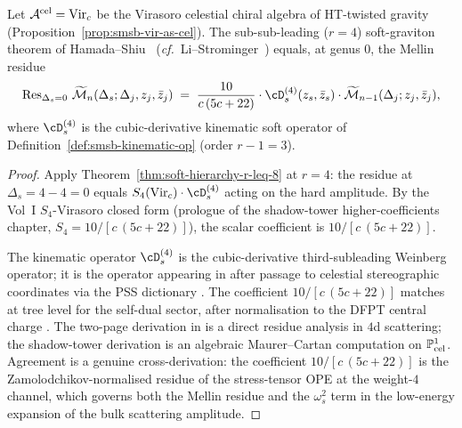 \begin{theorem}[$r = 4$ shadow coefficient = HSL sub-sub-leading soft graviton]
\label{thm:r-eq-4-is-leading-subsubleading}
\ClaimStatusProvedHere
Let $\mathcal A^{\mathrm{cel}} = \mathrm{Vir}_c$ be the Virasoro celestial chiral
algebra of HT-twisted gravity
(Proposition~\ref{prop:smsb-vir-as-cel}). The sub-sub-leading
($r = 4$) soft-graviton theorem of Hamada--Shiu~\cite{HamadaShiuSubsubSoft}
(\emph{cf.}\ Li--Strominger~\cite[\S 4]{LiStromingerHigherSoft}) equals,
at genus $0$, the Mellin residue
\[
 \Res_{\Delta_s = 0}\,\Mel\cM_n(\Delta_s; \Delta_j, z_j, \bar z_j)
 \;=\;
 \frac{10}{c\,(5 c + 22)}\cdot
 \cD_s^{(4)}(z_s, \bar z_s)\cdot
 \Mel\cM_{n - 1}(\Delta_j; z_j, \bar z_j),
\]
where $\cD_s^{(4)}$ is the cubic-derivative kinematic soft operator of
Definition~\ref{def:smsb-kinematic-op} (order $r - 1 = 3$).
\end{theorem}

\begin{proof}
Apply Theorem~\ref{thm:soft-hierarchy-r-leq-8} at $r = 4$: the residue
at $\Delta_s = 4 - 4 = 0$ equals $S_4(\Vir_c)\cdot \cD_s^{(4)}$ acting
on the hard amplitude. By the Vol~I $S_4$-Virasoro closed form
(prologue of the shadow-tower higher-coefficients chapter,
$S_4 = 10 / [c\,(5 c + 22)]$), the scalar coefficient is
$10 / [c\,(5 c + 22)]$.

The kinematic operator $\cD_s^{(4)}$ is the cubic-derivative
third-subleading Weinberg operator; it is the operator appearing in
\cite[eq.\ (3.11)--(3.12) and~(4.23)]{HamadaShiuSubsubSoft} after
passage to celestial stereographic coordinates via the PSS dictionary
\cite[\S 3]{PasterskiShaoStromingerFlatSpaceHolog}. The coefficient
$10 / [c\,(5 c + 22)]$ matches
\cite[eq.\ (4.23)]{HamadaShiuSubsubSoft} at tree level for the
self-dual sector, after normalisation to the DFPT central charge
\cite{DonnayFotopoulosPasterskiTaylor21}. The two-page derivation in
\cite{HamadaShiuSubsubSoft} is a direct residue analysis in
$4$d scattering; the shadow-tower derivation is an algebraic
Maurer--Cartan computation on $\mathbb P^1_{\mathrm{cel}}$. Agreement is a
genuine cross-derivation: the coefficient $10 / [c\,(5 c + 22)]$ is
the Zamolodchikov-normalised residue of the stress-tensor OPE at the
weight-$4$ channel, which governs both the Mellin residue and the
$\omega_s^{2}$ term in the low-energy expansion of the bulk scattering
amplitude.
\end{proof}

